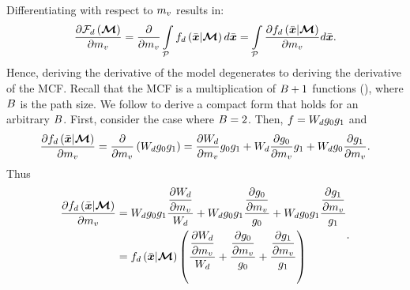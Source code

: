 \documentclass{article}
\begin{document}
Differentiating \eq{\ref{eq:forward_model}} with respect to $m_{v}$ results in:
\begin{equation}
\label{eq:int_derivative_app}
\frac{\partial \forwardmodel_{\nm}\regpar{\sceneparam}}{\partial \scenescalar_{\unknownindex}} = \frac{\partial}{\partial \scenescalar_{\unknownindex}}\intop_{\pathset}{\contfunc_{\nm}\regpar{\ppath|\sceneparam}d\ppath}
= \intop_{\pathset}{\frac{\partial \contfunc_{\nm}\regpar{\ppath|\sceneparam}}{\partial \scenescalar_{\unknownindex}}d\ppath}.
\end{equation}
Hence, deriving the derivative of the model degenerates to deriving the derivative of the \ac{MCF}. Recall that the \ac{MCF} is a multiplication of $B+1$ functions (\eqnopar{\ref{eq:cont_func}}), where $B$ is the path size. We follow \citep{gkioulekas2016evaluation} to derive a compact form that holds for an arbitrary $B$. 
First, consider the case where $B=2$. Then, $f = W_{d}  g_{0} g_{1}$ and
\begin{equation}
\dfrac{\partial {f_{d}\left({\Bar{\boldsymbol{x}}|\boldsymbol{\mathcal{M}}}\right)}}{\partial {m_{v}}}  = \dfrac{\partial}{\partial {m_{v}}}\left({ W_{d}  g_{0} g_{1}}\right) = \dfrac{\partial {W_{d}}}{\partial {m_{v}}}  g_{0}  g_{1} + W_{d}  \dfrac{\partial {g_{0}}}{\partial {m_{v}}} g_{1} + W_{d}  g_{0}  \dfrac{\partial {g_{1}}}{\partial {m_{v}}}.
\end{equation}
Thus
\begin{equation}
\label{eq:derivative_example_app}
\begin{split}
\dfrac{\partial {f_{d}\left({\Bar{\boldsymbol{x}}|\boldsymbol{\mathcal{M}}}\right)}}{\partial {m_{v}}} &=W_{d}  g_{0}  g_{1}  \dfrac{\dfrac{\partial {W_{d}}}{\partial {m_{v}}}}{W_{d}} + W_{d}  g_{0}  g_{1}  \dfrac{\dfrac{\partial {g_{0}}}{\partial {m_{v}}}}{g_{0}}+ W_{d}g_{0}  g_{1}  \dfrac{ \dfrac{\partial {g_{1}}}{\partial {m_{v}}}}{g_{1}} \\
&= f_{d}\left({\Bar{\boldsymbol{x}}|\boldsymbol{\mathcal{M}}}\right)  \left({\dfrac{\dfrac{\partial {W_{d}}}{\partial {m_{v}}}}{W_{d}} + \frac{\dfrac{\partial {g_0}}{\partial {m_{v}}}}{g_0} + \frac{\dfrac{\partial {g_1}}{\partial {m_{v}}}}{g_1}}\right)
\end{split}.
\end{equation}
\end{document}
